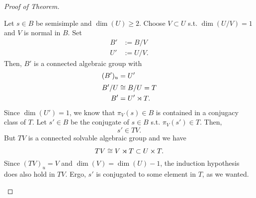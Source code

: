 \begin{proof}[Proof of Theorem]
\begin{itemize}
Let $s \in B$ be semisimple and $\dim(U) \geq 2$. Choose $V \subset U$ s.t. $\dim(U / V) = 1$ and $V$ is normal in $B$. Set
\begin{align*}
B' &:= B/V\\
U' &:= U/V.
\end{align*}
Then, $B'$ is a connected algebraic group with
\begin{align*}
(B')_u &= U'\\
B' / U& \overset{}{\cong} B/U = T\\
B' &= U' \rtimes T.
\end{align*}
Since $\dim(U') = 1$, we know that $\pi_V(s) \in B$ is contained in a conjugacy class of $T$.
Let $s'\in B$ be the conjugate of $s \in B$ s.t. $\pi_V(s') \in T$. Then,
\[ s' \in TV. \]
But $TV$ is a connected solvable algebraic group and we have
\[ TV \overset{}{\cong} V \rtimes T \subset U \times T. \]
Since $(TV)_u = V$ and $\dim(V) = \dim(U) - 1$, the induction hypothesis does also hold in $TV$. Ergo, $s'$ is conjugated to some element in $T$, as we wanted.
	\end{itemize}
\end{proof}

